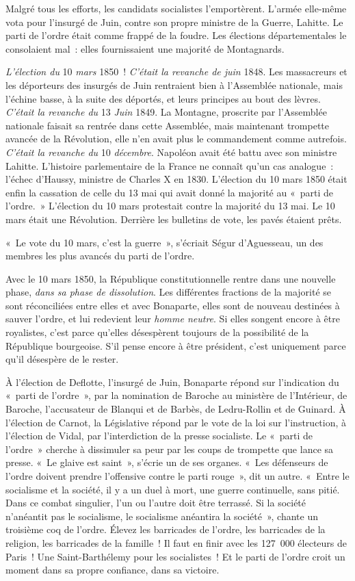 \documentclass[french,twoside]{book} %
\begin{document}
Malgré tous les efforts, les candidats socialistes l’emportèrent. L’armée elle-même vota pour l’insurgé de Juin, contre son propre ministre de la Guerre, Lahitte. Le parti de l’ordre était comme frappé de la foudre. Les élections départementales le consolaient mal : elles fournissaient une majorité de Montagnards.\par
\emph{L’élection du} 10 \emph{mars} 1850 ! \emph{C’était la revanche de juin} 1848. Les massacreurs et les déporteurs des insurgés de Juin rentraient bien à l’Assemblée nationale, mais l’échine basse, à la suite des déportés, et leurs principes au bout des lèvres. \emph{C’était la revanche du} 13 \emph{Juin} 1849. La Montagne, proscrite par l’Assemblée nationale faisait sa rentrée dans cette Assemblée, mais maintenant trompette avancée de la Révolution, elle n’en avait plus le commandement comme autrefois. \emph{C’était la revanche du} 10 \emph{décembre}. Napoléon avait été battu avec son ministre Lahitte. L’histoire parlementaire de la France ne connaît qu’un cas analogue : l’échec d’Haussy, ministre de Charles X en 1830. L’élection du 10 mars 1850 était enfin la cassation de celle du 13 mai qui avait donné la majorité au « parti de l’ordre. » L’élection du 10 mars protestait contre la majorité du 13 mai. Le 10 mars était une Révolution. Derrière les bulletins de vote, les pavés étaient prêts.\par
« Le vote du 10 mars, c’est la guerre », s’écriait Ségur d’Aguesseau, un des membres les plus avancés du parti de l’ordre.\par
Avec le 10 mars 1850, la République constitutionnelle rentre dans une nouvelle phase, \emph{dans sa phase de dissolution}. Les différentes fractions de la majorité se sont réconciliées entre elles et avec Bonaparte, elles sont de nouveau destinées à sauver l’ordre, et lui redevient leur \emph{homme neutre}. Si elles songent encore à être royalistes, c’est parce qu’elles désespèrent toujours de la possibilité de la République bourgeoise. S’il pense encore à être président, c’est uniquement parce qu’il désespère de le rester.\par
À l’élection de Deflotte, l’insurgé de Juin, Bonaparte répond sur l’indication du « parti de l’ordre », par la nomination de Baroche au ministère de l’Intérieur, de Baroche, l’accusateur de Blanqui et de Barbès, de Ledru-Rollin et de Guinard. À l’élection de Carnot, la Législative répond par le vote de la loi sur l’instruction, à l’élection de Vidal, par l’interdiction de la presse socialiste. Le « parti de l’ordre » cherche à dissimuler sa peur par les coups de trompette que lance sa presse. « Le glaive est saint », s’écrie un de ses organes. « Les défenseurs de l’ordre doivent prendre l’offensive contre le parti rouge », dit un autre. « Entre le socialisme et la société, il y a un duel à mort, une guerre continuelle, sans pitié. Dans ce combat singulier, l’un ou l’autre doit être terrassé. Si la société n’anéantit pas le socialisme, le socialisme anéantira la société », chante un troisième coq de l’ordre. Élevez les barricades de l’ordre, les barricades de la religion, les barricades de la famille ! Il faut en finir avec les 127 000 électeurs de Paris ! Une Saint-Barthélemy pour les socialistes ! Et le parti de l’ordre croit un moment dans sa propre confiance, dans sa victoire.\par
\end{document}
